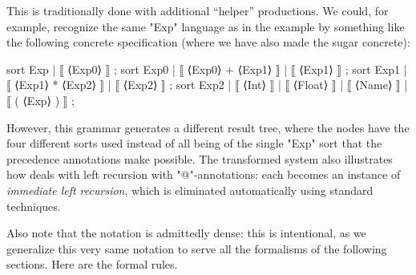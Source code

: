 \documentclass[11pt]{article} %
\begin{document}
{\small\begin{remark}
This is traditionally done with additional ``helper'' productions. We could, for example, recognize
the same "Exp" language as in the example by something like the following concrete \HAX
specification (where we have also made the sugar concrete):
\begin{hacs}[xleftmargin=\parindent]
sort Exp   | ⟦ ⟨Exp0⟩ ⟧ ;
sort Exp0  | ⟦ ⟨Exp0⟩ + ⟨Exp1⟩ ⟧ | ⟦ ⟨Exp1⟩ ⟧ ;
sort Exp1  | ⟦ ⟨Exp1⟩ * ⟨Exp2⟩ ⟧ | ⟦ ⟨Exp2⟩ ⟧ ;
sort Exp2  | ⟦ ⟨Int⟩ ⟧ | ⟦ ⟨Float⟩ ⟧ | ⟦ ⟨Name⟩ ⟧ | ⟦ ( ⟨Exp⟩ ) ⟧ ;
\end{hacs}%
However, this grammar generates a different result tree, where the nodes have the four different
sorts used instead of all being of the single "Exp" sort that the precedence annotations make
possible.  The transformed system also illustrates how \HAX deals with left recursion with
"@"-annotations: each becomes an instance of \emph{immediate left recursion}, which is eliminated
automatically using standard techniques.
\end{remark}}

Also note that the notation is admittedly dense: this is intentional, as we generalize this very
same notation to serve all the formalisms of the following sections.  Here are the formal rules.
\end{document}
